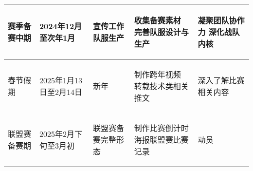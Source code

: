 \begin{longtable}{ X | X | X | X | X }
    \hline

        \begin{center}
            赛季备赛中期
        \end{center}&
        \begin{center}
            2024年12月至次年1月
        \end{center}&
        \begin{center}
            宣传工作
            \newline 队服生产
        \end{center}&
        \begin{center}
            收集备赛素材
            \newline 完善队服设计与生产
        \end{center}&
        \begin{center}
            凝聚团队协作力
            \newline 深化战队内核
        \end{center}\\
    
    \hline

        \begin{center}
            春节假期
        \end{center}&
        \begin{center}
            2025年1月13日至2月14日
        \end{center}&
        \begin{center}
            新年
        \end{center}&
        \begin{center}
            制作跨年视频
            \newline 转载技术类相关推文
        \end{center}&
        \begin{center}
            深入了解比赛相关内容
        \end{center}\\
    
    \hline

        \begin{center}
            联盟赛备赛期
        \end{center}&
        \begin{center}
            2025年2月下旬至3月初
        \end{center}&
        \begin{center}
            联盟赛备赛完整形态
        \end{center}&
        \begin{center}
            制作比赛倒计时海报联盟赛比赛记录
        \end{center}&
        \begin{center}
            动员
        \end{center}\\
    

\end{longtable}
